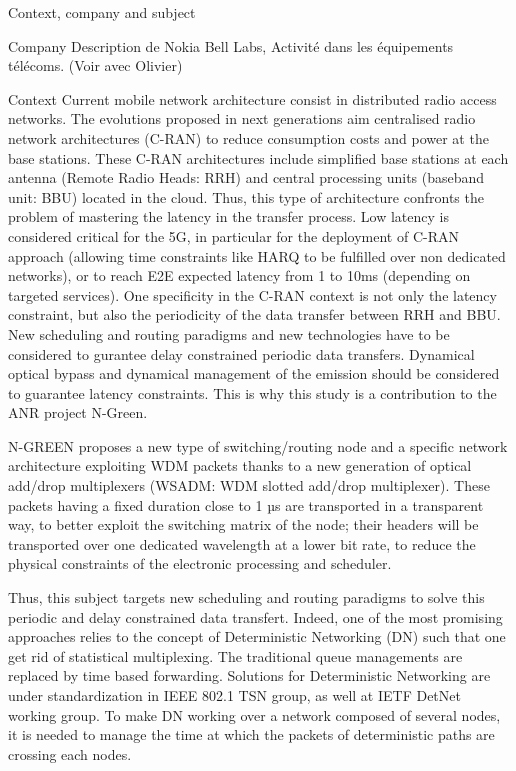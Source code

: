 \documentclass[a4paper,10pt]{report}
\begin{document}
\begin{chapter}{Context, company and subject}
\begin{section}{Company}
 Description de Nokia Bell Labs, Activité dans les équipements télécoms. (Voir avec Olivier)
\end{section}
\begin{section}{Context}
Current mobile network architecture consist in distributed radio access networks.
The evolutions proposed in next generations aim centralised radio network architectures (C-RAN) to reduce consumption costs 
and power at the base stations. These C-RAN architectures include simplified base stations at each antenna (Remote Radio Heads: RRH) 
and central processing units (baseband unit: BBU) located in the cloud. Thus, this type of architecture confronts the problem of mastering 
the latency in the transfer process.  Low latency is considered critical for the 5G, in particular for the deployment of C-RAN approach 
(allowing time constraints like HARQ to be fulfilled over non dedicated networks), or to reach E2E expected latency from 1 to 10ms 
(depending on targeted services). One specificity in the C-RAN context is not only the latency constraint, but also the periodicity of 
the data transfer between RRH and BBU.  New scheduling and routing paradigms and new technologies have to be considered to  gurantee 
delay constrained periodic data transfers. Dynamical optical bypass and dynamical management of the emission should be considered to
guarantee latency constraints. This is why this study is a contribution to the ANR project N-Green.

N-GREEN proposes a new type of switching/routing node and a specific network architecture exploiting WDM packets thanks to a new generation of optical add/drop multiplexers (WSADM: WDM slotted add/drop multiplexer). These packets having a fixed duration close to 1 µs are transported in a transparent way, to better exploit the switching matrix of the node; their headers will be transported over one dedicated wavelength at a lower bit rate, to reduce the physical constraints of the electronic processing and scheduler.

 Thus, this subject targets new scheduling and routing paradigms to solve this periodic and delay constrained data transfert.
 Indeed, one of the most promising approaches relies to the concept of Deterministic Networking (DN) such that one get rid of
 statistical multiplexing. The traditional queue managements are replaced by time based forwarding. Solutions for Deterministic 
 Networking are under standardization in IEEE 802.1 TSN group, as well at IETF DetNet working group.  To make DN working over a
 network composed of several nodes, it is needed to manage the time at which the packets of deterministic paths are crossing each nodes. 


\end{section}
\end{chapter}
\end{document}
